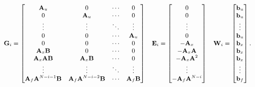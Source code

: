     \begin{equation}
    \begin{small}
        \begin{array}{rcl}
            \textbf{G}_i=\begin{bmatrix}
            \textbf{A}_u& 0& \cdots & 0\\
            0& \textbf{A}_u& \cdots & 0\\
            \vdots& \vdots& \ddots& \vdots\\
            0& 0& \cdots& \textbf{A}_u\\
            0& 0& \cdots& 0\\
            \textbf{A}_x\textbf{B}& 0& \cdots& 0\\
            \textbf{A}_x\textbf{A}\textbf{B}& \textbf{A}_x\textbf{B}& \cdots& 0\\
            \vdots& \vdots& \ddots& \vdots\\
            \textbf{A}_f\textbf{A}^{N-i-1}\textbf{B}& \textbf{A}_f\textbf{A}^{N-i-2}\textbf{B}& \cdots& \textbf{A}_f\textbf{B}\\
            \end{bmatrix}&
            \textbf{E}_i=\begin{bmatrix}
            0\\
            0\\
            \vdots\\
            0\\
            -\textbf{A}_x\\
            -\textbf{A}_x\textbf{A}\\
            -\textbf{A}_x\textbf{A}^2\\
            \vdots\\
            -\textbf{A}_f\textbf{A}^{N-i}\\
            \end{bmatrix}&
            \textbf{W}_i=\begin{bmatrix}
            \textbf{b}_u\\
            \textbf{b}_u\\
            \vdots\\
            \textbf{b}_u\\
            \textbf{b}_x\\
            \textbf{b}_x\\
            \textbf{b}_x\\
            \vdots\\
            \textbf{b}_f\\
            \end{bmatrix}.
        \end{array}
        \label{BASICMPC:equ:constrained_constraint_matrices}
        \end{small}
    \end{equation}

